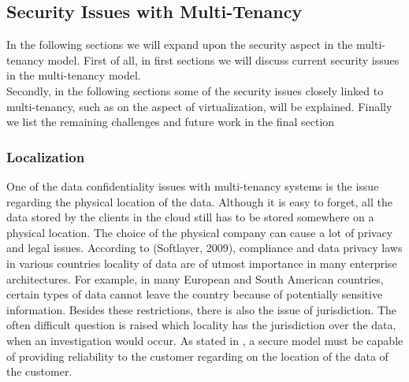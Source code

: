 \subsection{Security Issues with Multi-Tenancy}
In the following sections we will expand upon the security aspect in the multi-tenancy model. First of all, in first sections we will discuss current security issues in the multi-tenancy model. \\
Secondly, in the following sections some of the security issues closely linked to multi-tenancy, such as on the aspect of virtualization, will be explained. Finally we list the remaining challenges and future work in the final section\\

\subsubsection{Localization}
One of the data confidentiality issues with multi-tenancy systems is the issue regarding the physical location of the data. Although it is easy to forget, all the data stored by the clients in the cloud still has to be stored somewhere on a physical location. The choice of the physical company can cause a lot of privacy and legal issues. According to (Softlayer, 2009), compliance and data privacy laws in various countries locality of data are of utmost importance in many enterprise architectures. For example, in many European and South American countries, certain types of data cannot leave the country because of potentially sensitive information. Besides these restrictions, there is also the issue of jurisdiction. The often difficult question is raised which locality has the jurisdiction over the data, when an investigation would occur. As stated in \cite{Subashini2010Security}, a secure model must be capable of providing reliability to the customer regarding on the location of the data of the customer.\\

